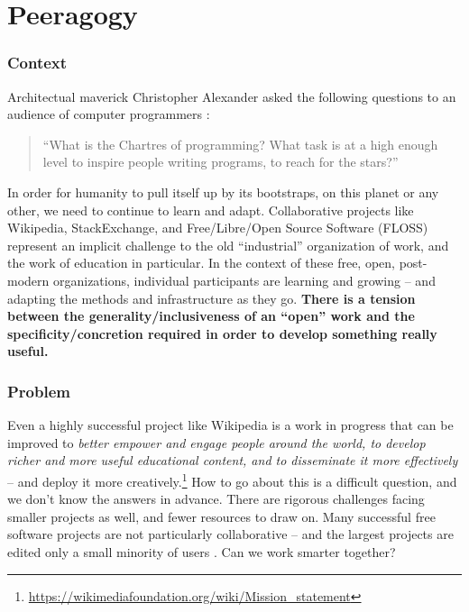 \section{Peeragogy}\label{sec:Peeragogy}

\subsubsection*{Context}  Architectual maverick Christopher Alexander asked the following questions to an audience of computer programmers \cite{alexander1999origins}: 
\begin{quote}
``What is the Chartres of programming? What task is at a high enough level to inspire people writing programs, to reach for the stars?''
\end{quote}
In order for humanity to pull itself up by its bootstraps, on this planet or any other, we need to continue to learn and adapt.  Collaborative projects like Wikipedia, StackExchange, and Free/Libre/Open Source Software (FLOSS) represent an implicit challenge to the old ``industrial'' organization of work, and the work of education in particular.  In the context of these free, open, post-modern organizations, individual participants are learning and growing -- and adapting the methods and infrastructure as they go.
\textbf{There is a tension between the generality/inclusiveness of an ``open'' work and the specificity/concretion required in order to develop something really useful.}

\subsubsection*{Problem} Even a highly successful project like Wikipedia is a work in progress that can be improved to \emph{\emph{better} empower and engage people around the world, to develop \emph{richer and more useful} educational content, and to disseminate it \emph{more} effectively} -- and deploy it more creatively.\footnote{\url{https://wikimediafoundation.org/wiki/Mission_statement}}  How to go about this is a difficult question, and we don't know the answers in advance.  There are rigorous challenges facing smaller projects as well, and fewer resources to draw on.  Many successful free software projects are not particularly collaborative -- and the largest projects are edited only a small minority of users \cite{free-software-better,who-writes-wikipedia}.  Can we work smarter together?

